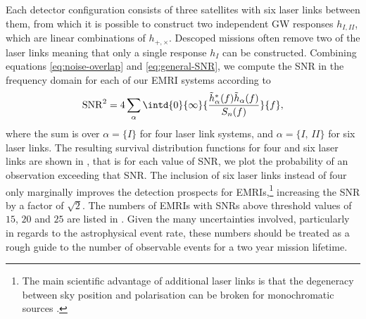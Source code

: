 Each detector configuration consists of three satellites with six laser links between them, from which it is possible to construct two independent GW responses $h_{I,II}$, which are linear combinations of $h_{+,\times}$. Descoped missions often remove two of the laser links meaning that only a single response $h_I$ can be constructed. Combining equations \eqref{eq:noise-overlap} and \eqref{eq:general-SNR}, we compute the SNR in the frequency domain for each of our EMRI systems according to
\begin{equation}
\label{eq:EMRI-SNR}
\mathrm{SNR}^2 = 4\sum_{\alpha}\intd{0}{\infty}{\frac{\tilde{h}^*_\alpha(f) \tilde{h}_\alpha(f)}{S_n(f)}}{f},
\end{equation}
where the sum is over $\alpha = \{I\}$ for four laser link systems, and $\alpha = \{I,\,II\}$ for six laser links. The resulting survival distribution functions for four and six laser links are shown in , that is for each value of SNR, we plot the probability of an observation exceeding that SNR. The inclusion of six laser links instead of four only marginally improves the detection prospects for EMRIs,\footnote{The main scientific advantage of additional laser links is that the degeneracy between sky position and polarisation can be broken for monochromatic sources \citep{vallisneri_sensitivity_2008}.} increasing the SNR by a factor of $\sqrt{2}$. The numbers of EMRIs with SNRs above threshold values of $15$, $20$ and $25$ are listed in . Given the many uncertainties involved, particularly in regards to the astrophysical event rate, these numbers should be treated as a rough guide to the number of observable events for a two year mission lifetime.

